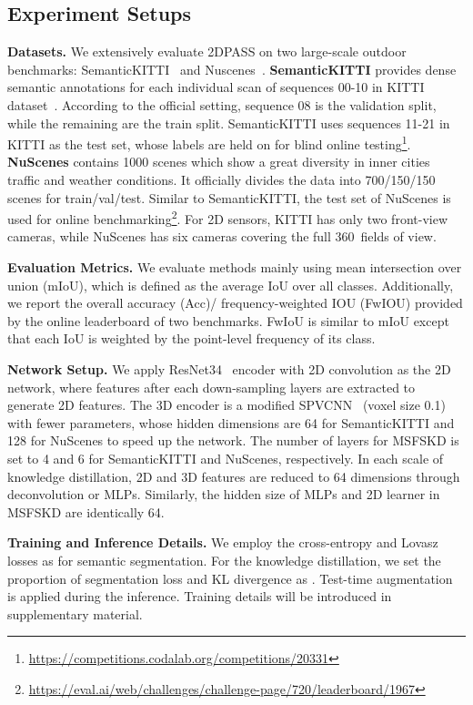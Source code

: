 \documentclass[runningheads]{llncs}
\begin{document}
	\subsection{Experiment Setups}
	\noindent\textbf{Datasets. }
We extensively evaluate 2DPASS on two large-scale outdoor benchmarks: SemanticKITTI~\cite{behley2019semantickitti} and Nuscenes~\cite{nuscenes}. \textbf{SemanticKITTI} provides dense semantic annotations for each individual scan of sequences 00-10 in KITTI dataset~\cite{geiger2012cvpr}. 
According to the official setting, sequence 08 is the validation split, while the remaining are the train split.
SemanticKITTI uses sequences 11-21 in KITTI as the test set, whose labels are held on for blind online testing\footnote{\url{https://competitions.codalab.org/competitions/20331}}.
\textbf{NuScenes} contains 1000 scenes which show a great diversity in inner cities traffic and weather conditions. It officially divides the data into 700/150/150 scenes for train/val/test. 
Similar to SemanticKITTI, the test set of NuScenes is used for online benchmarking\footnote{\url{https://eval.ai/web/challenges/challenge-page/720/leaderboard/1967}}.
For 2D sensors, KITTI has only two front-view cameras, while NuScenes has six cameras covering the full 360\degree~fields of view.
	
	\noindent\textbf{Evaluation Metrics.} 
	We evaluate methods mainly using mean intersection over union (mIoU), which is defined as the average IoU over all classes. 
Additionally, we report the overall accuracy (Acc)/ frequency-weighted IOU (FwIOU) provided by the online leaderboard of two benchmarks.
FwIoU is similar to mIoU except that each IoU is weighted by the point-level frequency of its class.
	
	\noindent\textbf{Network Setup.} 
We apply ResNet34~\cite{he2016deep} encoder with 2D convolution as the 2D network, where features after each down-sampling layers are extracted to generate 2D features.
The 3D encoder is a modified SPVCNN~\cite{tang2020searching} (voxel size 0.1) with fewer parameters, whose hidden dimensions are 64 for SemanticKITTI and 128 for NuScenes to speed up the network.
The number of layers  for MSFSKD is set to 4 and 6 for SemanticKITTI and NuScenes, respectively.
In each scale of knowledge distillation, 2D and 3D features are reduced to 64 dimensions through deconvolution or MLPs.
Similarly, the hidden size of MLPs and 2D learner in MSFSKD are identically 64.
	
	\noindent\textbf{Training and Inference Details.} 
	We employ the cross-entropy and Lovasz losses as \cite{zhou2020cylinder3d} for semantic segmentation. 
For the knowledge distillation, we set the proportion of segmentation loss and KL divergence as .
Test-time augmentation~\cite{zhou2020cylinder3d} is applied during the inference.
Training details will be introduced in supplementary material.
\end{document}
